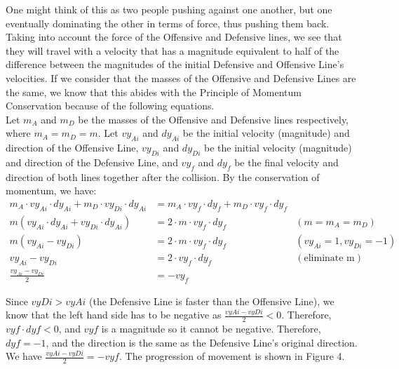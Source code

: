 One might think of this as two people pushing against one another, but one eventually dominating the other in terms of force, thus pushing them back. Taking into account the force of the Offensive and Defensive lines, we see that they will travel with a velocity that has a magnitude equivalent to half of the difference between the magnitudes of the initial Defensive and Offensive Line’s velocities. If we consider that the masses of the Offensive and Defensive Lines are the same, we know that this abides with the Principle of Momentum Conservation because of the following equations. \\

Let $m_A$ and $m_D$ be the masses of the Offensive and Defensive lines respectively, where $m_A = m_D = m$. Let $vy_{Ai}$ and $dy_{Ai}$ be the initial velocity (magnitude) and direction of the Offensive Line, $vy_{Di}$ and $dy_{Di}$ be the initial velocity (magnitude) and direction of the Defensive Line, and $vy_f$ and $dy_f$ be the final velocity and direction of both lines together after the collision. By the conservation of momentum, we have:
\begin{align*}
m_A \cdot vy_{Ai} \cdot dy_{Ai} + m_D \cdot vy_{Di} \cdot dy_{Ai} &= m_A \cdot vy_f \cdot dy_f + m_D \cdot vy_f \cdot dy_f \\
m(vy_{Ai} \cdot dy_{Ai} + vy_{Di} \cdot dy_{Ai}) &= 2 \cdot m \cdot vy_f \cdot dy_f & (m = m_A = m_D) \\
m(vy_{Ai} - vy_{Di}) &= 2 \cdot m \cdot vy_f \cdot dy_f & (vy_{Ai} = 1, vy_{Di} = -1) \\
vy_{Ai} - vy_{Di} &= 2 \cdot vy_f \cdot dy_f & (\text{eliminate m}) \\
\frac{vy_{Ai} - vy_{Di}}{2} &= -vy_f
\end{align*}

Since $vyDi > vyAi$ (the Defensive Line is faster than the Offensive Line), we know that the left hand side has to be negative as $\frac{vyAi - vyDi}{2} < 0$. Therefore, $vyf \cdot dyf < 0$, and $vyf$ is a magnitude so it cannot be negative. Therefore, $dyf = -1$, and the direction is the same as the Defensive Line’s original direction. We have $\frac{vyAi - vyDi}{2} = -vyf$. The progression of movement is shown in Figure 4.

\newpage

